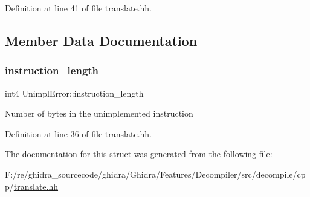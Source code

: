Definition at line 41 of file translate.\+hh.



\subsection{Member Data Documentation}
\mbox{\label{struct_unimpl_error_aa20932cfe081be954491dad23f4f056e}} 
\subsubsection{\texorpdfstring{instruction\_length}{instruction\_length}}
{\footnotesize\ttfamily int4 Unimpl\+Error\+::instruction\+\_\+length}

Number of bytes in the unimplemented instruction 

Definition at line 36 of file translate.\+hh.



The documentation for this struct was generated from the following file\+:\begin{DoxyCompactItemize}
\item 
F\+:/re/ghidra\+\_\+sourcecode/ghidra/\+Ghidra/\+Features/\+Decompiler/src/decompile/cpp/\mbox{\hyperlink{translate_8hh}{translate.\+hh}}\end{DoxyCompactItemize}
